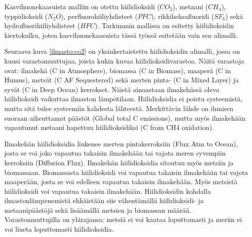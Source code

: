 \documentclass[finnish,12pt,a4paper,pdftex]{article}
\begin{document}
\begin{onehalfspacing}
Kasvihuonekaasuista malliin on otettu hiilidioksidi ($CO_2$), metaani ($CH_4$), typpidioksidi ($N_2O$), perfluorohiiliyhdisteet ($PFC$), rikkiheksafluoridi ($SF_6$) sekä hydrofluorihiiliyhdisteet ($HFC$). Tarkimmin mallissa on esitetty hiilidioksidin kiertokulku, joten kasvihuonekaasuista tässä työssä esitetään vain sen alimalli. 

Seuraava kuva \ref{ilmasto:co2} on yksinkertaistettu hiilidioksidin alimalli, jossa on kuusi varastomuuttujaa, joista kukin kuvaa hiilidioksidivarastoa. Näitä varastoja ovat: ilmakehä (C in Atmosphere), biomassa (C in Biomass), maaperä (C in Humus), metsät (C AF Sequestered) sekä merten pinta- (C in Mixed Layer) ja syvät (C in Deep Ocean) kerrokset. Näistä ainoastaan ilmakehässä oleva hiilidioksidi vaikuttaa ilmaston lämpötilaan. Hiilidioksidia ei poistu systeemistä, mutta sitä tulee systeemiin kahdesta lähteestä. Merkittävin lähde on ihmisen suoraan aiheuttamat päästöt (Global total C emissions), mutta myös ilmakehään vapautunut metaani hapettuu hiilidioksidiksi (C from CH4 oxidation). 

Ilmakehän hiilidioksidia liukenee merten pintakerroksiin (Flux Atm to Ocean), josta se voi joko vapautua takaisin ilmakehään tai vajota meren syvempiin kerroksiin (Diffusion Flux). Ilmakehän hiilidioksidia sitoutuu myös metsiin ja biomassaan. Biomassasta hiilidioksidi voi vapautua takaisin ilmakehään tai vajota maaperään, josta se voi edelleen vapautua takaisin ilmakehään. Myös metsistä hiilidioksidi voi vapautua takaisin ilmakehään. Hiilidioksidin kohdalla ilmastonlämpenemistä ehkäistään siis vähentämällä hiilidioksidi- ja metaanipäästöjä sekä lisäämällä metsien ja biomassan määrää. Varastomuuttujilla on ylärajansa: metsiä ei voi kaataa loputtomasti ja meriin ei voi liueta loputtomasti hiilidioksidia. 




\end{onehalfspacing}
\end{document}
